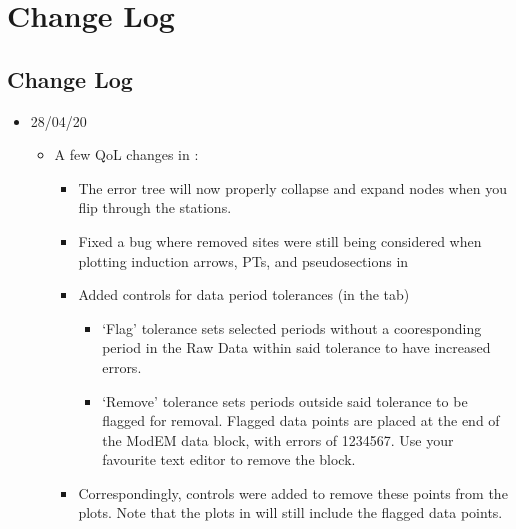 \documentclass[letterpaper,10pt,english]{sphinxmanual}
\begin{document}
\section{Change Log}
\label{\detokenize{index:change-log}}

\subsection{Change Log}
\label{\detokenize{content/misc/changelog:change-log}}\label{\detokenize{content/misc/changelog::doc}}\begin{itemize}
\item {} 
28/04/20
\begin{itemize}
\item {} 
A few QoL changes in {\hyperref[\detokenize{content/data_plot/main_window:data-plot}]{}}:
\begin{itemize}
\item {} 
The error tree will now properly collapse and expand nodes when you flip through the stations.

\item {} 
Fixed a bug where removed sites were still being considered when plotting induction arrows, PTs, and pseudosections in {\hyperref[\detokenize{content/data_plot/map_viewer:map-viewer}]{}}

\item {} 
Added controls for data period tolerances (in the {\hyperref[\detokenize{content/data_plot/main_window:error-manipulations}]{}} tab)
\begin{itemize}
\item {} 
‘Flag’ tolerance sets selected periods without a cooresponding period in the Raw Data within said tolerance to have increased errors.

\item {} 
‘Remove’ tolerance sets periods outside said tolerance to be flagged for removal. Flagged data points are placed at the end of the ModEM data block, with errors of 1234567. Use your favourite text editor to remove the block.

\end{itemize}

\item {} 
Correspondingly, controls were added to remove these points from the plots. Note that the plots in {\hyperref[\detokenize{content/data_plot/map_viewer:map-viewer}]{}} will still include the flagged data points.


\end{itemize}
\end{itemize}
\end{itemize}
\end{document}
